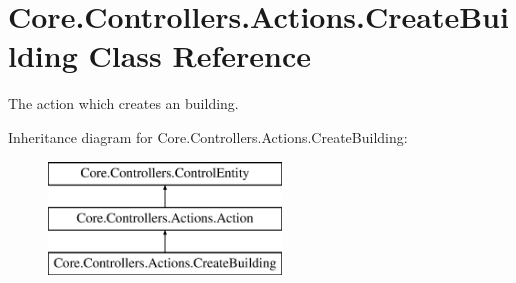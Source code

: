 \hypertarget{classCore_1_1Controllers_1_1Actions_1_1CreateBuilding}{}\section{Core.\+Controllers.\+Actions.\+Create\+Building Class Reference}
\label{classCore_1_1Controllers_1_1Actions_1_1CreateBuilding}


The action which creates an building.  


Inheritance diagram for Core.\+Controllers.\+Actions.\+Create\+Building\+:\begin{figure}[H]
\begin{center}
\leavevmode
\includegraphics[height=3.000000cm]{classCore_1_1Controllers_1_1Actions_1_1CreateBuilding}
\end{center}
\end{figure}
